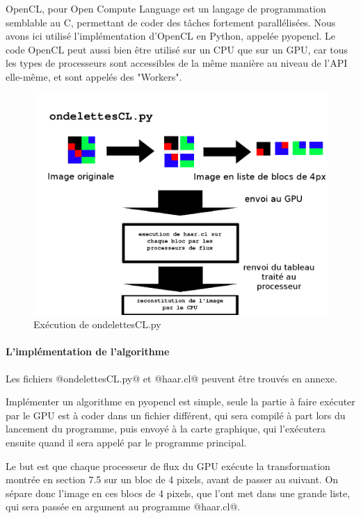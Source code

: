 OpenCL, pour Open Compute Language est un langage de programmation semblable au C, permettant de coder des tâches fortement parallélisées. Nous avons ici utilisé l'implémentation d'OpenCL en Python, appelée pyopencl. Le code OpenCL peut aussi bien être utilisé sur un CPU que sur un GPU, car tous les types de processeurs sont accessibles de la même manière au niveau de l'API elle-même, et sont appelés des "Workers".

\begin{figure}[!h]
\centering
\includegraphics[scale=0.4]{images/haarcl.png}
\caption{Exécution de ondelettesCL.py}
\label{haarcl}
\end{figure}

\clearpage


\paragraph{L'implémentation de l'algorithme}

Les fichiers @ondelettesCL.py@ et @haar.cl@ peuvent être trouvés en annexe.

Implémenter un algorithme en pyopencl est simple, seule la partie à faire exécuter par le GPU est à coder dans un fichier différent, qui sera compilé à part lors du lancement du programme, puis envoyé à la carte graphique, qui l'exécutera ensuite quand il sera appelé par le programme principal. 

Le but est que chaque processeur de flux du GPU exécute la transformation montrée en section 7.5 sur un bloc de 4 pixels, avant de passer au suivant. On sépare donc l'image en ces blocs de 4 pixels, que l'ont met dans une grande liste, qui sera passée en argument au programme @haar.cl@.

